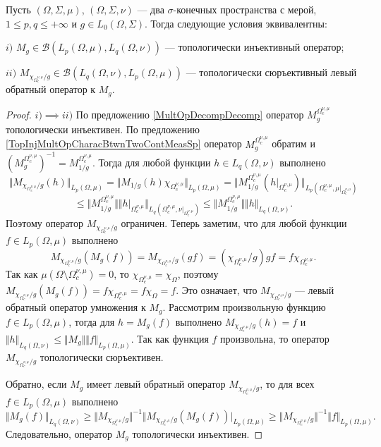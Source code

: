 \begin{proposition}\label{TopInjMultOpDescBtwnTwoMeasSp} Пусть $(\Omega,\Sigma,\mu)$, $(\Omega,\Sigma,\nu)$ --- два $\sigma$-конечных пространства с мерой, $1\leq p,q\leq +\infty$ и $g\in L_0(\Omega,\Sigma)$. Тогда следующие условия эквивалентны:

$i)$ $M_g\in\mathcal{B}(L_p(\Omega,\mu),L_q(\Omega,\nu))$ --- топологически инъективный оператор;

$ii)$ $M_{\chi_{\Omega_c^{\nu,\mu}}/g}\in\mathcal{B}(L_q(\Omega,\nu), L_p(\Omega,\mu))$ --- топологически сюръективный левый обратный оператор к $M_g$.
\end{proposition}
\begin{proof}
$i)$$\implies$$ ii)$ По предложению \ref{MultOpDecompDecomp} оператор  $M_g^{\Omega_c^{\nu,\mu}}$ топологически инъективен. По предложению \ref{TopInjMultOpCharacBtwnTwoContMeasSp} оператор $M_g^{\Omega_c^{\nu,\mu}}$ обратим и $(M_g^{\Omega_c^{\nu,\mu}})^{-1}=M_{1/g}^{\Omega_c^{\nu,\mu}}$. Тогда для любой функции $h\in L_q(\Omega,\nu)$ выполнено
$$
\Vert M_{\chi_{\Omega_c^{\nu,\mu}}/g}(h)\Vert_{L_p(\Omega,\mu)}=
\Vert M_{1/g}(h)\chi_{\Omega_c^{\nu,\mu}}\Vert_{L_p(\Omega,\mu)}=
\Vert M_{1/g}^{\Omega_c^{\nu,\mu}}(h|_{\Omega_c^{\nu,\mu}})\Vert_{L_p(\Omega_c^{\nu,\mu},\mu|_{\Omega_c^{\nu,\mu}})}
$$
$$
\leq\Vert M_{1/g}^{\Omega_c^{\nu,\mu}}\Vert\Vert h|_{\Omega_c^{\nu,\mu}}\Vert_{L_q(\Omega_c^{\nu,\mu},\nu|_{\Omega_c^{\nu,\mu}})}
\leq\Vert M_{1/g}^{\Omega_c^{\nu,\mu}}\Vert\Vert h\Vert_{L_q(\Omega,\nu)}.
$$ 
Поэтому оператор $M_{\chi_{\Omega_c^{\nu,\mu}}/g}$ ограничен. Теперь заметим, что для любой функции $f\in L_p(\Omega,\mu)$ выполнено
$$
M_{\chi_{\Omega_c^{\nu,\mu}}/g}(M_g(f))
=M_{\chi_{\Omega_c^{\nu,\mu}}/g}(g  f)
=(\chi_{\Omega_c^{\nu,\mu}}/g)  g  f
=f \chi_{\Omega_c^{\nu,\mu}}.
$$
Так как $\mu(\Omega\setminus\Omega_c^{\nu,\mu})=0$, то $\chi_{\Omega_c^{\nu,\mu}}=\chi_{\Omega}$, поэтому $M_{\chi_{\Omega_c^{\nu,\mu}}/g}(M_g(f))=f \chi_{\Omega_c^{\nu,\mu}}=f \chi_{\Omega}=f$. Это означает, что $M_{\chi_{\Omega_c^{\nu,\mu}}/g}$ --- левый обратный оператор умножения к $M_g$. Рассмотрим произвольную функцию $f\in L_p(\Omega,\mu)$, тогда для $h=M_g(f)$ выполнено $M_{\chi_{\Omega_c^{\nu,\mu}}/g}(h)=f$ и $\Vert h\Vert_{L_q(\Omega,\nu)}\leq\Vert M_g\Vert\Vert f\Vert_{L_p(\Omega,\mu)}$. Так как функция $f$ произвольна, то оператор $M_{\chi_{\Omega_c^{\nu,\mu}}/g}$ топологически сюръективен.

Обратно, если $M_g$ имеет левый обратный оператор $M_{\chi_{\Omega_c^{\nu,\mu}}/g}$, то для всех $f\in L_p(\Omega,\mu)$ выполнено
$$
\Vert M_g(f)\Vert_{L_q(\Omega,\nu)}
\geq\Vert M_{\chi_{\Omega_c^{\nu,\mu}}/g}\Vert^{-1}\Vert M_{\chi_{\Omega_c^{\nu,\mu}}/g}(M_g(f))\vert_{L_p(\Omega,\mu)}
\geq\Vert M_{\chi_{\Omega_c^{\nu,\mu}}/g}\Vert^{-1}\Vert f\Vert_{L_p(\Omega,\mu)}.
$$
Следовательно, оператор $M_g$ топологически инъективен.
\end{proof}


